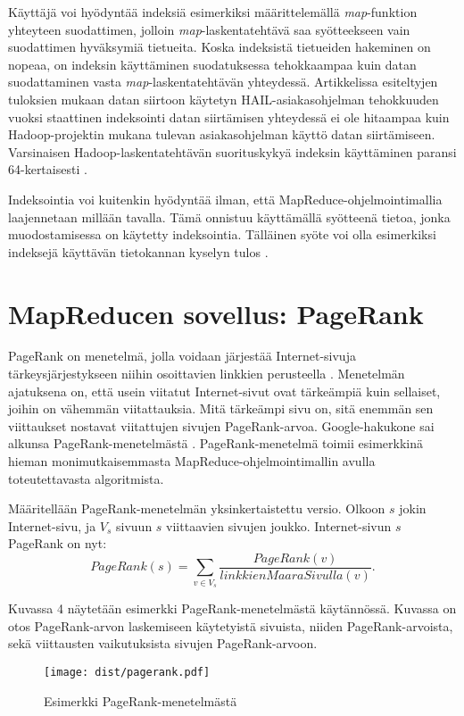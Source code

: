 \documentclass[finnish]{templates/tktltiki2}
\theoremstyle{definition}
\theoremstyle{remark}
\begin{document}
Käyttäjä voi hyödyntää indeksiä esimerkiksi määrittelemällä
\emph{map}-funktion yhteyteen suodattimen, jolloin
\emph{map}-laskentatehtävä saa syötteekseen vain suodattimen hyväksymiä
tietueita. Koska indeksistä tietueiden hakeminen on nopeaa, on indeksin
käyttäminen suodatuksessa tehokkaampaa kuin datan suodattaminen vasta
\emph{map}-laskentatehtävän yhteydessä. Artikkelissa esiteltyjen
tuloksien mukaan datan siirtoon käytetyn HAIL-asiakasohjelman
tehokkuuden vuoksi staattinen indeksointi datan siirtämisen yhteydessä
ei ole hitaampaa kuin Hadoop-projektin mukana tulevan asiakasohjelman
käyttö datan siirtämiseen. Varsinaisen Hadoop-laskentatehtävän
suorituskykyä indeksin käyttäminen paransi 64-kertaisesti
\cite{hail}.

Indeksointia voi kuitenkin hyödyntää ilman, että
MapReduce-ohjelmointimallia laajennetaan millään tavalla. Tämä onnistuu
käyttämällä syötteenä tietoa, jonka muodostamisessa on käytetty
indeksointia. Tälläinen syöte voi olla esimerkiksi indeksejä käyttävän
tietokannan kyselyn tulos \cite{mapreduce2}.

\section{MapReducen sovellus:
PageRank}\label{mapreducen-sovellus-pagerank}

PageRank on menetelmä, jolla voidaan järjestää Internet-sivuja
tärkeysjärjestykseen niihin osoittavien linkkien perusteella
\cite{pagerank}. Menetelmän ajatuksena on, että usein viitatut
Internet-sivut ovat tärkeämpiä kuin sellaiset, joihin on vähemmän
viitattauksia. Mitä tärkeämpi sivu on, sitä enemmän sen viittaukset
nostavat viitattujen sivujen PageRank-arvoa. Google-hakukone sai alkunsa
PageRank-menetelmästä \cite{pagerank}. PageRank-menetelmä toimii
esimerkkinä hieman monimutkaisemmasta MapReduce-ohjelmointimallin avulla
toteutettavasta algoritmista.

Määritellään PageRank-menetelmän yksinkertaistettu versio. Olkoon \(s\)
jokin Internet-sivu, ja \(V_s\) sivuun \(s\) viittaavien sivujen joukko.
Internet-sivun \(s\) PageRank on nyt: \[
PageRank(s) = \sum_{v \in V_s} \frac {PageRank(v)} {linkkienMaaraSivulla(v)}.
\]

Kuvassa 4 näytetään esimerkki PageRank-menetelmästä käytännössä. Kuvassa
on otos PageRank-arvon laskemiseen käytetyistä sivuista, niiden
PageRank-arvoista, sekä viittausten vaikutuksista sivujen
PageRank-arvoon.

\begin{figure}[!b]
\centering
\texttt{[image: dist/pagerank.pdf]}
\caption{Esimerkki PageRank-menetelmästä}
\end{figure}
\end{document}
